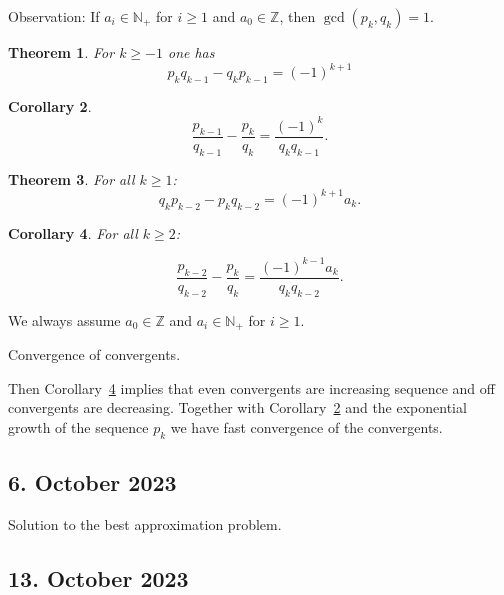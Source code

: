 \documentclass[a4paper,11pt,american]{article}
\theoremstyle{plain}
\newtheorem{theorem}{Theorem}
\newtheorem{corollary}[theorem]{Corollary}
\theoremstyle{definition}
\begin{document}
Observation: If $a_i ∈ℕ_+$ for $i≥1$ and $a_0 ∈ℤ$, then $\gcd(p_k,q_k) = 1$.


\begin{theorem}
  \label{thr:3}
  For $k≥ -1$ one has
  \begin{displaymath}
    p_k q_{k-1} - q_k p_{k-1} = (-1)^{k+1} 
  \end{displaymath}
\end{theorem}

\begin{corollary}
  \label{co:1}
  \begin{equation}
    \label{eq:4}
      \frac{p_{k-1}}{q_{k-1}} - \frac{p_k}{q_k} = \frac{(-1)^k }{q_k q_{k-1}}.    
  \end{equation}

\end{corollary}

\begin{theorem}
  For all $k≥1$:
  \begin{displaymath}
    q_k p_{k-2} - p_k q_{k-2} = (-1)^ {k+1} a_k. 
  \end{displaymath}
\end{theorem}


\begin{corollary}
  \label{co:2}
  For all $k≥ 2$:

  \begin{displaymath}
    \frac{p_{k-2}}{q_{k-2}} -    \frac{p_k}{q_k} = \frac{(-1)^{k-1} a_k}{q_k q_{k-2}}. 
  \end{displaymath}
\end{corollary}

We always assume $a_0∈ℤ$ and $a_i ∈ ℕ_+$ for $i≥1$.





Convergence of convergents.  

Then Corollary~\ref{co:2} implies that even convergents are increasing sequence and off convergents are decreasing. Together with Corollary~\ref{co:1} and the exponential growth of the sequence $p_k$ we have fast convergence of the convergents.



\subsection*{6. October 2023}
Solution to the best approximation problem.

\subsection*{13. October 2023}
\end{document}
